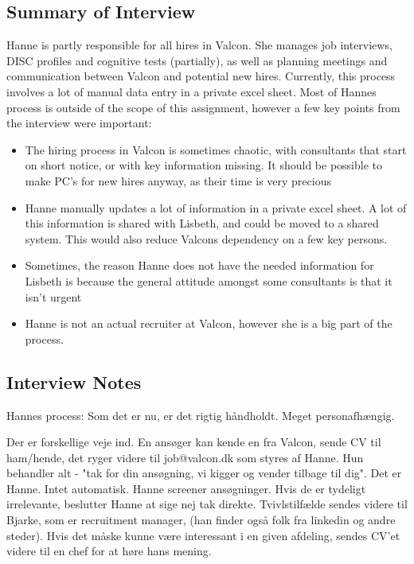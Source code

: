 \subsection{Summary of Interview}
Hanne is partly responsible for all hires in Valcon. She manages job interviews, DISC profiles and cognitive tests (partially), as well as planning meetings and communication between Valcon and potential new hires. \newline
Currently, this process involves a lot of manual data entry in a private excel sheet. 
Most of Hannes process is outside of the scope of this assignment, however a few key points from the interview were important:
\begin{itemize}
	\item{The hiring process in Valcon is sometimes chaotic, with consultants that start on short notice, or with key information missing. It should be possible to make PC's for new hires anyway, as their time is very precious}
	\item{Hanne manually updates a lot of information in a private excel sheet. A lot of this information is shared with Lisbeth, and could be moved to a shared system. This would also reduce Valcons dependency on a few key persons.}
	\item{Sometimes, the reason Hanne does not have the needed information for Lisbeth is because the general attitude amongst some consultants is that it isn't urgent}
	\item Hanne is not an actual recruiter at Valcon, however she is a big part of the process.
\end{itemize}

\subsection{Interview Notes}
Hannes process:
Som det er nu, er det rigtig håndholdt. Meget personafhængig. 

Der er forskellige veje ind. En ansøger kan kende en fra Valcon, sende CV til ham/hende, det ryger videre til job@valcon.dk som styres af Hanne.
Hun behandler alt - "tak for din ansøgning, vi kigger og vender tilbage til dig". Det er Hanne. Intet automatisk.
Hanne screener ansøgninger. Hvis de er tydeligt irrelevante, beslutter Hanne at sige nej tak direkte. Tvivlstilfælde sendes videre til Bjarke, som er recruitment manager, (han finder også folk fra linkedin og andre steder).
Hvis det måske kunne være interessant i en given afdeling, sendes CV'et videre til en chef for at høre hans mening. 

